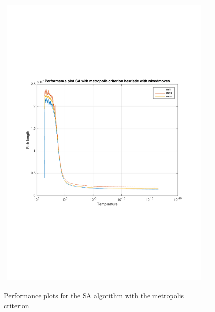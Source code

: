 \documentclass[a4paper, 11pt]{scrartcl}
\begin{document}
\begin{figure}[!ht]
\begin{tabular}{cc}
    \includegraphics[scale=0.4, trim={3cm 6cm 1cm 6cm}]{../figures/perfPlot_SA_metropolis_mixed.pdf}
  \end{tabular}
  \caption{Performance plots for the SA algorithm with the metropolis criterion}
  \label{fig:perfPlot-SA-metropolis}
\end{figure}
\end{document}
